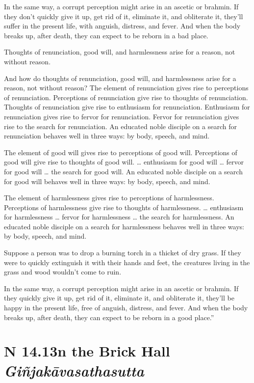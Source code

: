 \documentclass[12pt,openany]{book}%
\newcommand*{\suttatitleacronym}[1]{\smaller[2]{#1}\vspace*{.3em}}
\newcommand*{\suttatitletranslation}[1]{\linebreak{#1}}
\newcommand*{\suttatitleroot}[1]{\linebreak\smaller[2]\itshape{#1}}
\newcommand*{\tocacronym}[1]{\hspace*{-3.3em}{#1}\quad}
\newcommand*{\toctranslation}[1]{#1}
\newcommand*{\tocroot}[1]{(\textit{#1})}
\begin{document}
In the same way, a corrupt perception might arise in an ascetic or brahmin. If they don’t quickly give it up, get rid of it, eliminate it, and obliterate it, they’ll suffer in the present life, with anguish, distress, and fever. And when the body breaks up, after death, they can expect to be reborn in a bad place. 

Thoughts of renunciation, good will, and harmlessness arise for a reason, not without reason. 

And how do thoughts of renunciation, good will, and harmlessness arise for a reason, not without reason? The element of renunciation gives rise to perceptions of renunciation. Perceptions of renunciation give rise to thoughts of renunciation. Thoughts of renunciation give rise to enthusiasm for renunciation. Enthusiasm for renunciation gives rise to fervor for renunciation. Fervor for renunciation gives rise to the search for renunciation. An educated noble disciple on a search for renunciation behaves well in three ways: by body, speech, and mind. 

The element of good will gives rise to perceptions of good will. Perceptions of good will give rise to thoughts of good will. … enthusiasm for good will … fervor for good will … the search for good will. An educated noble disciple on a search for good will behaves well in three ways: by body, speech, and mind. 

The element of harmlessness gives rise to perceptions of harmlessness. Perceptions of harmlessness give rise to thoughts of harmlessness. … enthusiasm for harmlessness … fervor for harmlessness … the search for harmlessness. An educated noble disciple on a search for harmlessness behaves well in three ways: by body, speech, and mind. 

Suppose a person was to drop a burning torch in a thicket of dry grass. If they were to quickly extinguish it with their hands and feet, the creatures living in the grass and wood wouldn’t come to ruin. 

In the same way, a corrupt perception might arise in an ascetic or brahmin. If they quickly give it up, get rid of it, eliminate it, and obliterate it, they’ll be happy in the present life, free of anguish, distress, and fever. And when the body breaks up, after death, they can expect to be reborn in a good place.” 

%
\section*{{\suttatitleacronym SN 14.13}{\suttatitletranslation In the Brick Hall }{\suttatitleroot Giñjakāvasathasutta}}
\addcontentsline{toc}{section}{\tocacronym{SN 14.13} \toctranslation{In the Brick Hall } \tocroot{Giñjakāvasathasutta}}
\end{document}
